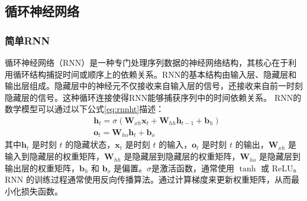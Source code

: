 \subsection{循环神经网络}
\subsubsection{简单RNN}
循环神经网络（RNN）是一种专门处理序列数据的神经网络结构，其核心在于利用循环结构捕捉时间或顺序上的依赖关系\cite{elmanFindingStructureTime1990}。RNN的基本结构由输入层、隐藏层和输出层组成。隐藏层中的神经元不仅接收来自输入层的信号，还接收来自前一时刻隐藏层的信号。这种循环连接使得RNN能够捕获序列中的时间依赖关系。
RNN的数学模型可以通过以下公式\eqref{eq:rnnht}描述：
\begin{align}
   & \mathbf{h}_t = \sigma(\mathbf{W}_{xh} \mathbf{x}_t + \mathbf{W}_{hh} \mathbf{h}_{t-1} + \mathbf{b}_h) \label{eq:rnnht} \\
   & {\mathbf{o}_t = \mathbf{W}_{ho} \mathbf{h}_t + \mathbf{b}_o} \label{eq:rnnot}
\end{align}
其中$\mathbf{h}_t$ 是时刻 $t$ 的隐藏状态，$\mathbf{x}_t$ 是时刻 $t$ 的输入，$\mathbf{o}_t$ 是时刻 $t$ 的输出，$\mathbf{W}_{xh}$ 是输入到隐藏层的权重矩阵，$\mathbf{W}_{hh}$ 是隐藏层到隐藏层的权重矩阵，$\mathbf{W}_{ho}$ 是隐藏层到输出层的权重矩阵，$\mathbf{b}_h$ 和 $\mathbf{b}_o$ 是偏置。$\sigma$是激活函数，通常使用 $\tanh$ 或 $\text{ReLU}$。RNN 的训练过程通常使用反向传播算法。通过计算梯度来更新权重矩阵，从而最小化损失函数。


